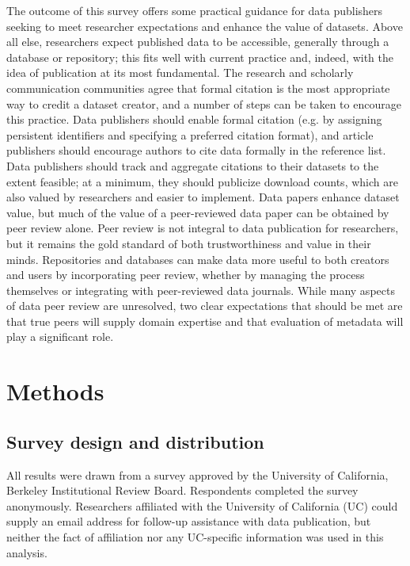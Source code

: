 \documentclass[10pt]{article}
\begin{document}
The outcome of this survey offers some practical guidance for data publishers seeking to meet researcher expectations and enhance the value of datasets.
Above all else, researchers expect published data to be accessible, generally through a database or repository; this fits well with current practice and, indeed, with the idea of publication at its most fundamental.
The research and scholarly communication communities agree that formal citation is the most appropriate way to credit a dataset creator, and a number of steps can be taken to encourage this practice.
Data publishers should enable formal citation (e.g. by assigning persistent identifiers and specifying a preferred citation format), and article publishers should encourage authors to cite data formally in the reference list.
Data publishers should track and aggregate citations to their datasets to the extent feasible; at a minimum, they should publicize download counts, which are also valued by researchers and easier to implement.
Data papers enhance dataset value, but much of the value of a peer-reviewed data paper can be obtained by peer review alone.
Peer review is not integral to data publication for researchers, but it remains the gold standard of both trustworthiness and value in their minds.
Repositories and databases can make data more useful to both creators and users by incorporating peer review, whether by managing the process themselves or integrating with peer-reviewed data journals.
While many aspects of data peer review are unresolved, two clear expectations that should be met are that true peers will supply domain expertise and that evaluation of metadata will play a significant role.


\section*{Methods}

\subsection*{Survey design and distribution}
All results were drawn from a survey approved by the University of California, Berkeley Institutional Review Board.
Respondents completed the survey anonymously.
Researchers affiliated with the University of California (UC) could supply an email address for follow-up assistance with data publication, but neither the fact of affiliation nor any UC-specific information was used in this analysis.
\end{document}
